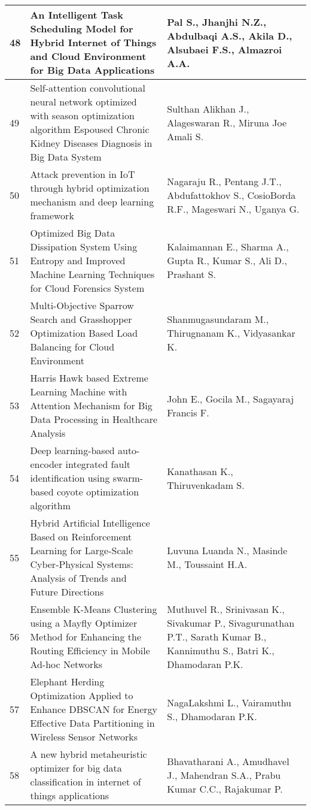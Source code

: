 \begin{longtable}{|p{}|p{}|p{}|}
\hline
48 & An Intelligent Task Scheduling Model for Hybrid Internet of Things and Cloud Environment for Big Data Applications & Pal S., Jhanjhi N.Z., Abdulbaqi A.S., Akila D., Alsubaei F.S., Almazroi A.A. \\
\hline
49 & Self-attention convolutional neural network optimized with season optimization algorithm Espoused Chronic Kidney Diseases Diagnosis in Big Data System & Sulthan Alikhan J., Alageswaran R., Miruna Joe Amali S. \\
\hline
50 & Attack prevention in IoT through hybrid optimization mechanism and deep learning framework & Nagaraju R., Pentang J.T., Abdufattokhov S., CosioBorda R.F., Mageswari N., Uganya G. \\
\hline
51 & Optimized Big Data Dissipation System Using Entropy and Improved Machine Learning Techniques for Cloud Forensics System & Kalaimannan E., Sharma A., Gupta R., Kumar S., Ali D., Prashant S. \\
\hline
52 & Multi-Objective Sparrow Search and Grasshopper Optimization Based Load Balancing for Cloud Environment & Shanmugasundaram M., Thirugnanam K., Vidyasankar K. \\
\hline
53 & Harris Hawk based Extreme Learning Machine with Attention Mechanism for Big Data Processing in Healthcare Analysis & John E., Gocila M., Sagayaraj Francis F. \\
\hline
54 & Deep learning-based auto-encoder integrated fault identification using swarm-based coyote optimization algorithm & Kanathasan K., Thiruvenkadam S. \\
\hline
55 & Hybrid Artificial Intelligence Based on Reinforcement Learning for Large-Scale Cyber-Physical Systems: Analysis of Trends and Future Directions & Luvuna Luanda N., Masinde M., Toussaint H.A. \\
\hline
56 & Ensemble K-Means Clustering using a Mayfly Optimizer Method for Enhancing the Routing Efficiency in Mobile Ad-hoc Networks & Muthuvel R., Srinivasan K., Sivakumar P., Sivagurunathan P.T., Sarath Kumar B., Kannimuthu S., Batri K., Dhamodaran P.K. \\
\hline
57 & Elephant Herding Optimization Applied to Enhance DBSCAN for Energy Effective Data Partitioning in Wireless Sensor Networks & NagaLakshmi L., Vairamuthu S., Dhamodaran P.K. \\
\hline
58 & A new hybrid metaheuristic optimizer for big data classification in internet of things applications & Bhavatharani A., Amudhavel J., Mahendran S.A., Prabu Kumar C.C., Rajakumar P. \\

\end{longtable}
